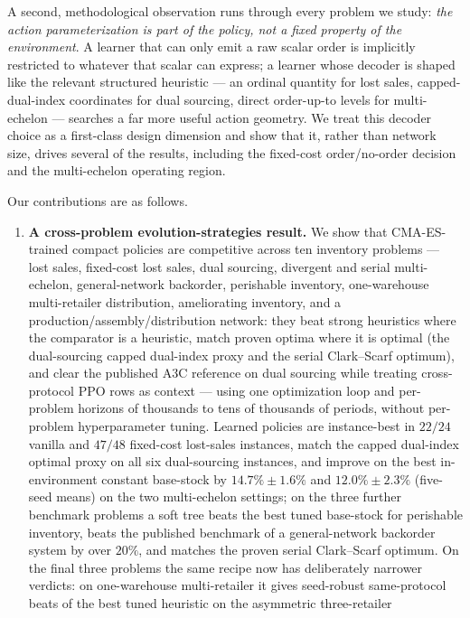 \documentclass[11pt]{article}
\begin{document}
A second, methodological observation runs through every problem we study: \emph{the action
parameterization is part of the policy, not a fixed property of the environment}. A learner that can
only emit a raw scalar order is implicitly restricted to whatever that scalar can express; a learner
whose decoder is shaped like the relevant structured heuristic --- an ordinal quantity for lost
sales, capped-dual-index coordinates for dual sourcing, direct order-up-to levels for multi-echelon
--- searches a far more useful action geometry. We treat this decoder choice as a first-class design
dimension and show that it, rather than network size, drives several of the results, including the
fixed-cost order/no-order decision and the multi-echelon operating region.

Our contributions are as follows.
\begin{enumerate}
    \item \textbf{A cross-problem evolution-strategies result.} We show that CMA-ES-trained compact
    policies are competitive across ten inventory problems --- lost sales, fixed-cost lost sales, dual
    sourcing, divergent and serial multi-echelon, general-network backorder, perishable inventory,
    one-warehouse multi-retailer distribution, ameliorating inventory, and a
    production/assembly/distribution network:
    they beat strong heuristics where the comparator is a heuristic, match proven optima where it is
    optimal (the dual-sourcing capped dual-index proxy and the serial Clark--Scarf optimum), and clear
    the published A3C reference on dual sourcing while treating cross-protocol PPO rows as context ---
    using one
    optimization loop and per-problem horizons of thousands to tens of thousands of periods, without
    per-problem hyperparameter tuning. Learned policies are instance-best in $22/24$ vanilla and
    $47/48$ fixed-cost lost-sales instances, match the capped dual-index optimal proxy on all six
    dual-sourcing instances, and improve on the best in-environment constant base-stock by
    $14.7\%\pm1.6\%$ and $12.0\%\pm2.3\%$ (five-seed means) on the two multi-echelon settings; on the three further benchmark problems a soft tree beats the
    best tuned base-stock for perishable inventory, beats the published benchmark of a general-network
    backorder system by over $20\%$, and matches the proven serial Clark--Scarf optimum. On the final
    three problems the same recipe now has deliberately narrower verdicts: on one-warehouse
    multi-retailer it gives seed-robust same-protocol beats of the best tuned heuristic on the asymmetric three-retailer

\end{enumerate}
\end{document}
